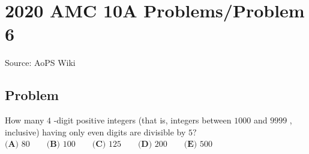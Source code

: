 \documentclass[12pt]{article}
\begin{document}
\section*{{2020 AMC 10A Problems/Problem 6}}
Source: AoPS Wiki

\subsection*{Problem}
How many $4$ -digit positive integers (that is, integers between $1000$ and $9999$ , inclusive) having only even digits are divisible by $5?$ $\textbf{(A) } 80 \qquad \textbf{(B) } 100 \qquad \textbf{(C) } 125 \qquad \textbf{(D) } 200 \qquad \textbf{(E) } 500$
\end{document}
